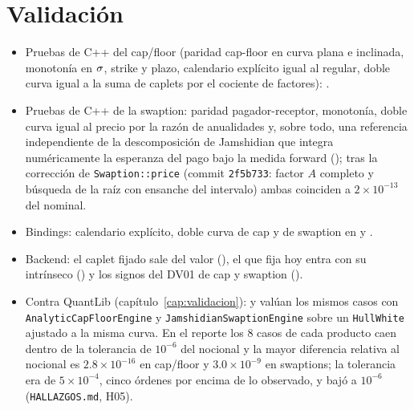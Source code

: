 \section{Validación}\label{sec:cap05-validacion}

\begin{itemize}
  \item Pruebas de C++ del cap/floor (paridad cap-floor en curva plana e inclinada, monotonía en $\sigma$,
        strike y plazo, calendario explícito igual al regular, doble curva igual a la suma de caplets por el
        cociente de factores): .
  \item Pruebas de C++ de la swaption: paridad pagador-receptor, monotonía, doble curva igual al precio por la
        razón de anualidades y, sobre todo, una referencia independiente de la descomposición de Jamshidian que
        integra numéricamente la esperanza del pago bajo la medida forward
        (); tras la corrección de \texttt{Swaption::price}
        (commit \texttt{2f5b733}: factor $A$ completo y búsqueda de la raíz con ensanche del intervalo) ambas
        coinciden a $2\times10^{-13}$ del nominal.
  \item Bindings: calendario explícito, doble curva de cap y de swaption en
        y
        .
  \item Backend: el caplet fijado sale del valor
        (),
        el que fija hoy entra con su intrínseco
        ()
        y los signos del DV01 de cap y swaption
        ().
  \item Contra QuantLib (capítulo~\ref{cap:validacion}):  y
         valúan los mismos casos con
        \texttt{AnalyticCapFloorEngine} y \texttt{JamshidianSwaptionEngine} sobre un \texttt{HullWhite}
        ajustado a la misma curva. En el reporte  los 8 casos
        de cada producto caen dentro de la tolerancia de $10^{-6}$ del nocional y la mayor diferencia
        relativa al nocional es $2.8\times10^{-16}$ en cap/floor y $3.0\times10^{-9}$ en swaptions; la tolerancia
        era de $5\times10^{-4}$, cinco órdenes por encima de lo observado, y bajó a $10^{-6}$ (\texttt{HALLAZGOS.md}, H05).
\end{itemize}

